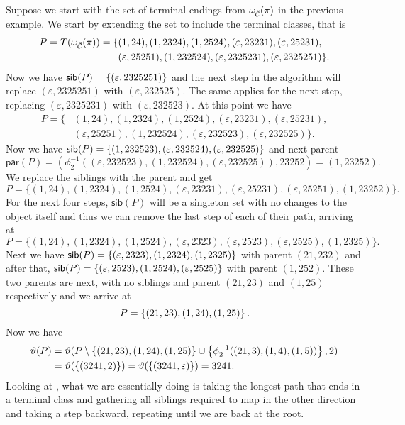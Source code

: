 Suppose we start with the set of terminal endings from $\omega_{\check{\mathcal{C}}}(\pi)$ in the previous example. We start by extending the set to include the terminal classes, that is
\begin{align*}
    P = T(\omega_{\check{\mathcal{C}}}(\pi)) = \{&(1,24), (1,2324), (1,2524), (\varepsilon,23231), (\varepsilon,25231),\\ &(\varepsilon,25251), (1,232524), (\varepsilon,2325231), (\varepsilon,2325251)\}.
\end{align*}
Now we have $\textsf{sib}(P) = \left\{(\varepsilon,2325251)\right\}$ and the next step in the algorithm will replace $(\varepsilon,2325251)$ with $(\varepsilon,232525)$. The same applies for the next step, replacing $(\varepsilon,2325231)$ with $(\varepsilon,232523)$. At this point we have
\begin{align*}
    P = \{&(1,24), (1,2324), (1,2524), (\varepsilon,23231), (\varepsilon,25231),\\ &(\varepsilon,25251), (1,232524), (\varepsilon,232523), (\varepsilon,232525)\}.
\end{align*}
Now we have $\textsf{sib}(P) = \left\{(1,232523), (\varepsilon,232524), (\varepsilon,232525)\right\}$ and next parent
\[
    \textsf{par}(P) = (\phi_2^{-1}((\varepsilon, 232523),(1, 232524),(\varepsilon, 232525)), 23252) = (1,23252).
\]
We replace the siblings with the parent and get
\[
    P = \{(1,24), (1,2324), (1,2524), (\varepsilon,23231), (\varepsilon,25231),(\varepsilon,25251), (1,23252)\}.
\]
For the next four steps, $\textsf{sib}(P)$ will be a singleton set with no changes to the object itself and thus we can remove the last step of each of their path, arriving at
\[
    P = \{(1,24), (1,2324), (1,2524), (\varepsilon,2323), (\varepsilon,2523),(\varepsilon,2525), (1,2325)\}.
\]
Next we have $\textsf{sib}(P) = \left\{(\varepsilon, 2323), (1, 2324), (1,2325)\right\}$ with parent $(21,232)$ and after that, $\textsf{sib}(P) = \left\{(\varepsilon, 2523), (1, 2524), (\varepsilon,2525)\right\}$ with parent $(1,252)$. These two parents are next, with no siblings and parent $(21,23)$ and $(1,25)$ respectively and we arrive at 
\[
    P = \left\{(21,23),(1,24),(1,25)\right\}.
\]
Now we have
\begin{align*}
    \vartheta(P) &= \vartheta(P \setminus \left\{(21,23),(1,24),(1,25)\right\} \cup \left\{\phi_2^{-1}((21,3),(1,4),(1,5))\right\}, 2)\\
    &= \vartheta(\left\{(3241,2)\right\}) = \vartheta(\left\{(3241,\varepsilon)\right\}) = 3241.
\end{align*}
Looking at , what we are essentially doing is taking the longest path that ends in a terminal class and gathering all siblings required to map in the other direction and taking a step backward, repeating until we are back at the root.

